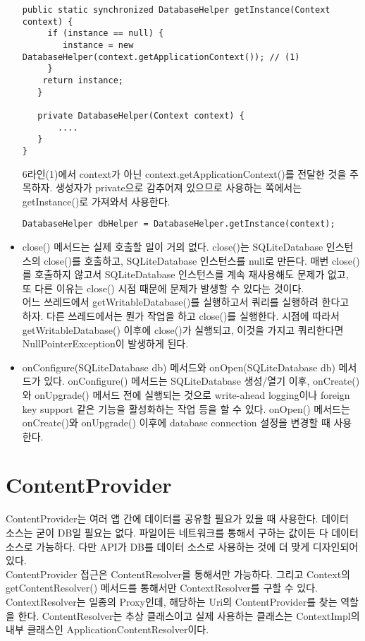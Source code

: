 \begin{itemize}
\begin{lstlisting}[frame=single]
  public static synchronized DatabaseHelper getInstance(Context context) {
     if (instance == null) {
        instance = new DatabaseHelper(context.getApplicationContext()); // (1)
     }
    return instance;
   }
 
   private DatabaseHelper(Context context) {
       ....
   }
}
\end{lstlisting}
6라인(1)에서 context가 아닌 context.getApplicationContext()를 전달한 것을 주목하자.
생성자가 private으로 감추어져 있으므로 사용하는 쪽에서는 getInstance()로 가져와서 사용한다.
\begin{lstlisting}[frame=single] 
DatabaseHelper dbHelper = DatabaseHelper.getInstance(context);
\end{lstlisting}

\item close() 메서드는 실제 호출할 일이 거의 없다.
close()는 SQLiteDatabase 인스턴스의 close()를 호출하고, SQLiteDatabase 인스턴스를 null로 만든다.  매번 close()를 호출하지 않고서 SQLiteDatabase 인스턴스를 계속 재사용해도 문제가 없고, 또 다른 이유는 close() 시점 때문에 문제가 발생할 수 있다는 것이다.\\

어느 쓰레드에서 getWritableDatabase()를 실행하고서 쿼리를 실행하려 한다고 하자. 다른 쓰레드에서는 뭔가 작업을 하고 close()를 실행한다. 시점에 따라서 getWritableDatabase() 이후에 close()가 실행되고, 이것을 가지고 쿼리한다면  NullPointerException이 발생하게 된다. 
\item onConfigure(SQLiteDatabase db) 메서드와 onOpen(SQLiteDatabase db) 메서드가 있다. onConfigure() 메서드는 SQLiteDatabase 생성/열기 이후, onCreate()와 onUpgrade() 메서드 전에 실행되는 것으로 write-ahead logging이나 foreign key support 같은 기능을 활성화하는 작업 등을 할 수 있다. onOpen() 메서드는 onCreate()와 onUpgrade() 이후에 database connection 설정을 변경할 때 사용한다.

\end{itemize}

\section{ContentProvider}
ContentProvider는 여러 앱 간에 데이터를 공유할 필요가 있을 때 사용한다. 데이터 소스는 굳이 DB일 필요는 없다. 파일이든 네트워크를 통해서 구하는 값이든 다 데이터 소스로 가능하다. 다만 API가 DB를 데이터 소스로 사용하는 것에 더 맞게 디자인되어 있다.\\

ContentProvider 접근은 ContentResolver를 통해서만 가능하다. 그리고 Context의 getContentResolver() 메서드를 통해서만 ContextResolver를 구할 수 있다.  
ContextResolver는 일종의 Proxy인데, 해당하는 Uri의 ContentProvider를 찾는 역할을 한다.
ContentResolver는 추상 클래스이고 실제 사용하는 클래스는 ContextImpl의 내부 클래스인 ApplicationContentResolver이다.

